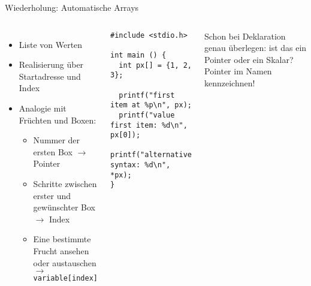 \begin{frame}[fragile]{Wiederholung: Automatische Arrays}
%
\begin{columns}[T]
\begin{itemize}
\item Liste von Werten
\item Realisierung über Startadresse und Index
\item Analogie mit Früchten und Boxen:
	\begin{itemize}
	\item Nummer der ersten Box \newline 
		$\rightarrow$ Pointer\\
		\vspace{3pt}
	\item Schritte zwischen erster und gewünschter Box \newline
		$\rightarrow$ Index\\
		\vspace{3pt}
	\item Eine bestimmte Frucht ansehen oder austauschen \newline
		$\rightarrow$ \texttt{variable[index]}
	\end{itemize}
\end{itemize}
%
\vspace{-13pt}
\begin{codebox}
\begin{verbatim}
#include <stdio.h>

int main () {
  int px[] = {1, 2, 3};

  printf("first item at %p\n", px);
  printf("value first item: %d\n", px[0]);
  printf("alternative syntax: %d\n", *px);
}
\end{verbatim}
\end{codebox}
%
\begin{hintbox}
\small
Schon bei Deklaration genau überlegen: ist das ein Pointer oder ein Skalar?\newline
\Thus Pointer im Namen kennzeichnen!
\end{hintbox}
\end{columns}

%
\end{frame}


